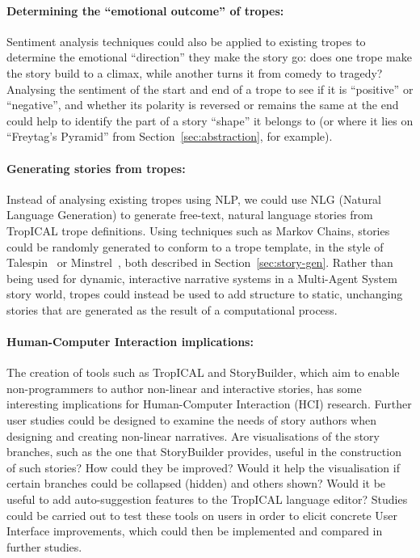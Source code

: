 \documentclass[11pt]{report}
\begin{document}
\paragraph{Determining the ``emotional outcome'' of tropes:} Sentiment analysis
techniques could also be applied to existing tropes to determine the emotional
``direction'' they make the story go: does one trope make the story build to a
climax, while another turns it from comedy to tragedy? Analysing the sentiment
of the start and end of a trope to see if it is ``positive'' or ``negative'',
and whether its polarity is reversed or remains the same at the end could help
to identify the part of a story ``shape'' it belongs to (or where it lies on
``Freytag's Pyramid'' from Section~\ref{sec:abstraction}, for example).

\paragraph{Generating stories from tropes:} Instead of analysing existing tropes
using NLP, we could use NLG (Natural Language Generation) to generate free-text,
natural language stories from TropICAL trope definitions. Using techniques such
as Markov Chains, stories could be randomly generated to conform to a trope
template, in the style of Talespin~\citep{meehan1977tale} or
Minstrel~\citep{turner1993minstrel}, both described in
Section~\ref{sec:story-gen}. Rather than being used for dynamic, interactive
narrative systems in a Multi-Agent System story world, tropes could instead be
used to add structure to static, unchanging stories that are generated as the
result of a computational process.

\paragraph{Human-Computer Interaction implications:} The creation of tools such
as TropICAL and StoryBuilder, which aim to enable non-programmers to author
non-linear and interactive stories, has some interesting implications for
Human-Computer Interaction (HCI) research. Further user studies could be
designed to examine the needs of story authors when designing and creating
non-linear narratives. Are visualisations of the story branches, such as the one
that StoryBuilder provides, useful in the construction of such stories? How
could they be improved? Would it help the visualisation if certain branches
could be collapsed (hidden) and others shown? Would it be useful to add
auto-suggestion features to the TropICAL language editor? Studies could be
carried out to test these tools on users in order to elicit concrete User
Interface improvements, which could then be implemented and compared in further studies.
\end{document}
